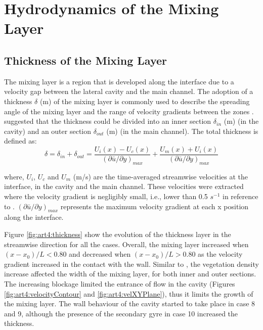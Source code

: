 \section{Hydrodynamics of the Mixing Layer}
\subsection{Thickness of the Mixing Layer}
The mixing layer is a region that is developed along the interface due to a velocity gap between the lateral cavity and the main channel. The adoption of a thickness $\delta$  (m) of the mixing layer is commonly used to describe the spreading angle of the mixing layer and the range of velocity gradients between the zones \cite{xiang2020,Mignot2017,Yossef2011}. \textcite{xiang2020} suggested that the thickness could be divided into an inner section $\delta_{in}$  (m) (in the cavity) and an outer section $\delta_{out}$  (m) (in the main channel). The total thickness  is defined as:
\begin{equation}
\delta=\delta_{in}+\delta_{out}=\frac{U_i(x)-U_c(x)}{\left (\partial \bar{u} / \partial y  \right )_{max}}+\frac{U_m(x)+U_i(x)}{\left (\partial \bar{u} / \partial y  \right )_{max}}
\label{eqn:art4:thickness}
\end{equation}

where, $U_i$, $U_c$ and $U_m$ (m/s) are the time-averaged streamwise velocities at the interface, in the cavity and the main channel. These velocities were extracted where the velocity gradient is negligibly small, i.e., lower than 0.5 $s^{-1}$ in reference to \textcite{xiang2020,Mignot2017}. $\left (\partial \bar{u} / \partial y  \right )_{max}$ represents the maximum velocity gradient at each x position along the interface.

Figure \ref{fig:art4:thickness} show the evolution of the thickness layer in the streamwise direction for all the cases. Overall, the mixing layer increased when $(x-x_0)/L<0.80$ and decreased when $(x-x_0)/L>0.80$ as the velocity gradient increased in the contact with the wall. Similar to \textcite{xiang2020}, the vegetation density increase affected the width of the mixing layer, for both inner and outer sections. The increasing blockage limited the entrance of flow in the cavity (Figures \ref{fig:art4:velocityContour} and \ref{fig:art4:velXYPlane}), thus it limits the growth of the mixing layer. The wall behaviour of the cavity started to take place in case 8 and 9, although the presence of the secondary gyre in case 10 increased the thickness.

